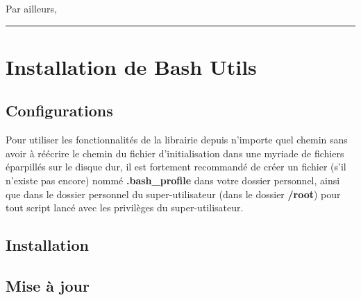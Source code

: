 \documentclass[a4paper,10pt]{article}
\begin{document}
Par ailleurs, \\[1\baselineskip]

\color{red}\par\noindent\rule{\textwidth}{0.4pt}\color{white}

\color{red}
\section{Installation de Bash Utils}\color{white}

\color{green}
\subsection{Configurations}\color{white}
Pour utiliser les fonctionnalités de la librairie depuis n'importe quel chemin sans avoir à réécrire le chemin du fichier d'initialisation dans une myriade de fichiers éparpillés sur le disque dur, il est fortement recommandé de créer un fichier (s'il n'existe pas encore) nommé \color{lime}\textbf{.bash\_profile}\color{white} dans votre dossier personnel, ainsi que dans le dossier personnel du super-utilisateur (dans le dossier \color{lime}\textbf{/root}\color{white}) pour tout script lancé avec les privilèges du super-utilisateur.

\color{green}
\subsection{Installation}\color{white}

\color{green}
\subsection{Mise à jour}\color{white}
\end{document}

